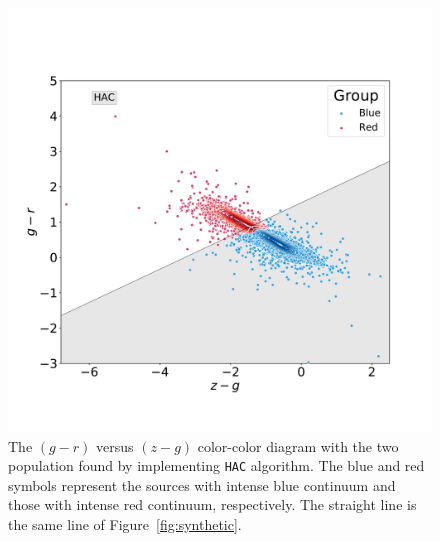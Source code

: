 \documentclass[fleqn,usenatbib]{mnras}
\begin{document}
\begin{figure}
	\includegraphics[width=0.9\linewidth]{Figs/blued-red-hierarchical.pdf}
    \caption{The $(g - r)$ versus $(z - g)$ color-color diagram with the two population
    found by implementing \texttt{HAC} algorithm. The blue and red symbols represent the 
    sources with intense blue continuum and those with intense red continuum, respectively. 
    The straight line is the same line of Figure~\ref{fig:synthetic}.}
    \label{fig:hierar}
\end{figure}
\end{document}
